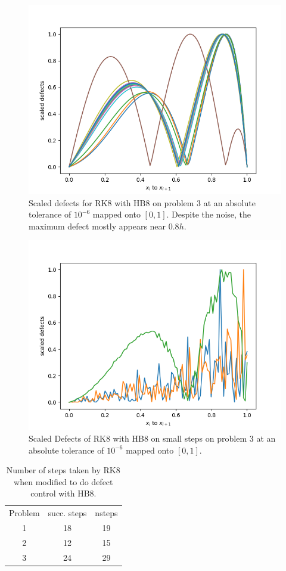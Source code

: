\begin{figure}[H]
\centering
\includegraphics[width=0.7\linewidth]{./figures/rk8_with_hb8_p3_scaled_defects}
\caption{Scaled defects for RK8 with HB8 on problem 3 at an absolute tolerance of $10^{-6}$  mapped onto $[0, 1]$. Despite the noise, the maximum defect mostly appears near $0.8h$.}
\label{fig:rk8_with_hb8_p3_scaled_defects}
\end{figure}

\begin{figure}[H]
\centering
\includegraphics[width=0.7\linewidth]{./figures/rk8_with_hb8_p3_scaled_defects_small_steps}
\caption{Scaled Defects of RK8 with HB8 on small steps on problem 3 at an absolute tolerance of $10^{-6}$ mapped onto $[0, 1]$.}
\label{fig:rk8_with_hb8_p3_scaled_defects_small_steps}
\end{figure}

\begin{table}[h]
\caption {Number of steps taken by RK8 when modified to do defect control with HB8.} \label{tab:rk8_with_hb8_nsteps}
\begin{center}
\begin{tabular}{ c c c } 
Problem & succ. steps & nsteps \\ 
1       & 18             &        19 \\ 
2       & 12             &        15 \\
3       & 24             &        29 \\
\end{tabular}
\end{center}
\end{table}